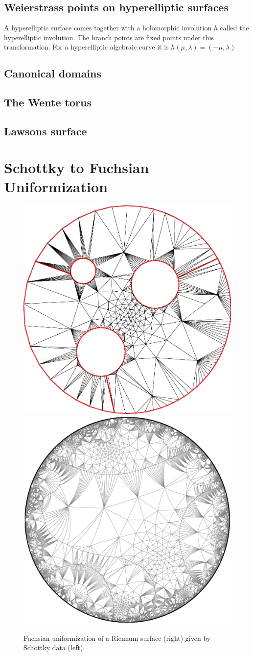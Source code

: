 \documentclass[Thesis.tex]{subfiles}
\begin{document}
\subsection{Weierstrass points on hyperelliptic surfaces}
A hyperelliptic surface comes together with a holomorphic involution $h$ called the hyperelliptic involution. The branch points are fixed points under this transformation. For a hyperelliptic algebraic curve it is $h(\mu, \lambda)=(-\mu, \lambda)$

\subsection{Canonical domains}
\subsection{The Wente torus}
\subsection{Lawsons surface}



\section{Schottky to Fuchsian Uniformization}

\begin{figure}
	\centering
	\includegraphics[width=0.45\linewidth]{data/g3_schottky01/schottky02_convert_pdf.png}
	\includegraphics[width=0.45\linewidth]{data/g3_schottky01/schottky02_pdf.png}
	\caption{Fuchsian uniformization of a Riemann surface (right) given by Schottky data (left).}
	\label{fig:fuchsian_to_schottky}
\end{figure}
\end{document}
